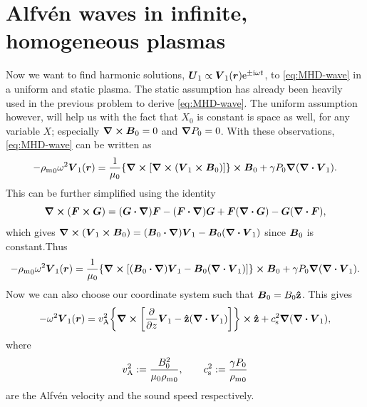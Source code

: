 \documentclass[11pt,a4paper, 
swedish, english %
]{article}
\newcommand{\rhom}{\ensuremath{{\rho_{\text{m}}}}}
\newcommand{\vA}{\ensuremath{v_{\text{A}}}}
\newcommand{\cs}{\ensuremath{c_{\text{s}}}}
\begin{document}
\section{Alfvén waves in infinite, homogeneous plasmas}
Now we want to find harmonic solutions,
$\vb*U_1\propto\vb*V_1(\vb*r)\mathrm{e}^{\pm\mathrm{i}\omega t}$, to
\eqref{eq:MHD-wave} in a uniform and static plasma. The static
assumption has already been heavily used in the previous problem to
derive \eqref{eq:MHD-wave}. The uniform assumption however, will help
us with the fact that $X_0$ is constant is space as well, for any
variable $X$; especially $\curl\vb*B_0=0$ and $\grad P_0=0$. With
these observations, \eqref{eq:MHD-wave} can be written as
\begin{equation}
-\rhom_0\omega^2\vb*V_1(\vb*r)
=\frac{1}{\mu_0}
\qty{\curl\qty[\curl\qty(\vb*V_1\cross\vb*B_0)]}\cross\vb*B_0
+\gamma P_0 \grad(\div\vb*V_1).
\end{equation}
This can be further simplified using the identity
\begin{equation}\label{eq:curl-cross}
\curl(\vb*F\cross\vb*G)
=(\vb*G\vdot\grad)\vb*F - (\vb*F\vdot\grad)\vb*G
+\vb*F(\div\vb*G) - \vb*G(\div\vb*F),
\end{equation}
which gives
$\curl(\vb*V_1\cross\vb*B_0)
=(\vb*B_0\vdot\grad)\vb*V_1 - \vb*B_0(\div\vb*V_1)$
since $\vb*B_0$ is constant.Thus
\begin{equation}
-\rhom_0\omega^2\vb*V_1(\vb*r)
=\frac{1}{\mu_0}
\qty{\curl\qty[(\vb*B_0\vdot\grad)\vb*V_1 
- \vb*B_0(\div\vb*V_1)]}\cross\vb*B_0
+\gamma P_0 \grad(\div\vb*V_1).
\end{equation}
Now we can also choose our coordinate system such that
$\vb*B_0=B_0\vu{z}$. This gives
\begin{equation}\label{eq4:MHD-wave_real}
-\omega^2\vb*V_1(\vb*r)
=\vA^2\qty{\curl\qty[\pdv{z}\vb*V_1 
- \vu{z}(\div\vb*V_1)]}\cross\vu{z}
+\cs^2 \grad(\div\vb*V_1),
\end{equation}
where
\begin{equation}
\vA^2:=\frac{B_0^2}{\mu_0\rhom_0}\qc\quad
\cs^2:=\frac{\gamma P_0}{\rhom_0}
\end{equation}
are the Alfvén velocity and the sound speed respectively.
\end{document}
